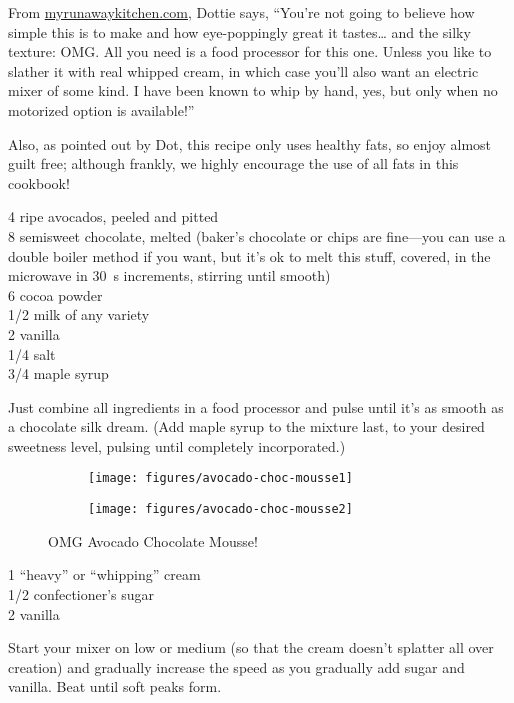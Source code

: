 \begin{open}
    From \url{myrunawaykitchen.com}, Dottie says, ``You’re not going to believe how simple this is to make and how eye-poppingly great it tastes… and the silky texture: OMG.  All you need is a food processor for this one.  Unless you like to slather it with real whipped cream, in which case you’ll also want an electric mixer of some kind.  I have been known to whip by hand, yes, but only when no motorized option is available!''

    Also, as pointed out by Dot, this recipe only uses healthy fats, so enjoy almost guilt free; although frankly, we highly encourage the use of all fats in this cookbook!
\end{open}
\begin{ingredients}
    4 ripe avocados, peeled and pitted\\
    \SI{8}{\ounce} semisweet chocolate, melted (baker’s chocolate or chips are fine---you can use a double boiler method if you want, but it's ok to melt this stuff, covered, in the microwave in \SI{30}{\second} increments, stirring until smooth)\\
    \SI{6}{\tblspoon} cocoa powder\\
    \SI{1/2}{\cup} milk of any variety\\
    \SI{2}{\teaspoon} vanilla\\
    \SI{1/4}{\teaspoon} salt\\
    \SI{3/4}{\cup} maple syrup
\end{ingredients}
Just combine all ingredients in a food processor and pulse until it’s as smooth
as a chocolate silk dream.  (Add maple syrup to the mixture last, to your
desired sweetness level, pulsing until completely incorporated.)
\begin{figure}
    \centering
    \begin{subfigure}{0.4\textwidth}
        \centering
        \texttt{[image: figures/avocado-choc-mousse1]}
    \end{subfigure}
    \begin{subfigure}{0.4\textwidth}
        \centering
        \texttt{[image: figures/avocado-choc-mousse2]}
    \end{subfigure}
    \caption*{OMG Avocado Chocolate Mousse!}
\end{figure}


\begin{ingredients}
    \SI{1}{\quart} ``heavy'' or ``whipping'' cream\\
    \SI{1/2}{\cup} confectioner's sugar\\
    \SI{2}{\teaspoon} vanilla
\end{ingredients}
Start your mixer on low or medium (so that the cream doesn't splatter all over creation) and gradually increase the speed as you gradually add sugar and vanilla.  Beat until soft peaks form.

